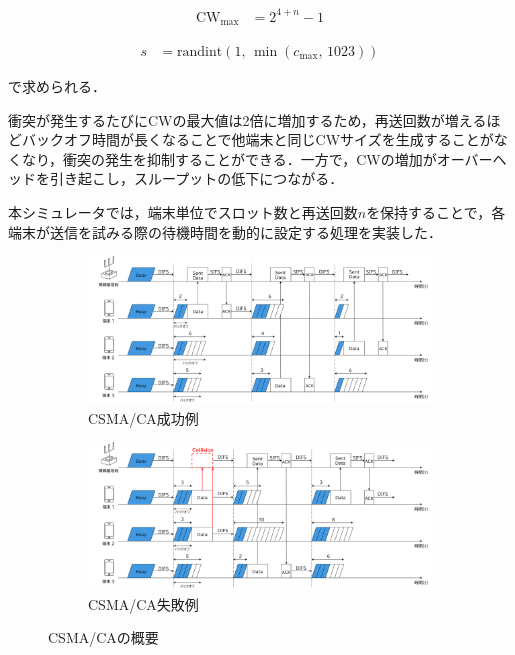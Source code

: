 \documentclass[a4paper, 10pt]{ltjsarticle}
\begin{document}
\begin{align}
  \mathrm{CW}_{\max} &= 2^{4 + n} - 1
\end{align}

\begin{align}
  s &= \mathrm{randint}(1, \, \min(c_{\max}, \, 1023))
  \label{slot}
\end{align}

で求められる．

衝突が発生するたびにCWの最大値は2倍に増加するため，再送回数が増えるほどバックオフ時間が長くなることで他端末と同じCWサイズを生成することがなくなり，衝突の発生を抑制することができる．一方で，CWの増加がオーバーヘッドを引き起こし，スループットの低下につながる．



本シミュレータでは，端末単位でスロット数と再送回数$n$を保持することで，各端末が送信を試みる際の待機時間を動的に設定する処理を実装した．


\begin{figure}[htbp]
  \centering

  \begin{subfigure}{\columnwidth}
    \centering
    \includegraphics[width=1\columnwidth]{./assets/csma-ca-s.png}
    \caption{CSMA/CA成功例}
    \label{1a}
  \end{subfigure}


  \begin{subfigure}{\columnwidth}
    \centering
    \includegraphics[width=1\columnwidth]{./assets/csma-ca-f.png}
    \caption{CSMA/CA失敗例}
    \label{1b}
  \end{subfigure}


  \caption{CSMA/CAの概要}
  \label{CSMA/CA}
\end{figure}
\end{document}
